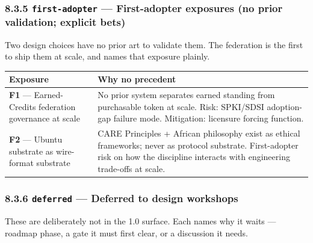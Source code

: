 \documentclass[11pt]{article}
\begin{document}
\subsubsection*{8.3.5 \texttt{first-adopter} — First-adopter exposures (no prior validation; explicit bets)}


Two design choices have no prior art to validate them. The federation is the first to ship them at scale, and names that exposure plainly.


{\footnotesize
\begin{longtable}{|p{8.0cm}|p{8.0cm}|}\hline
\textbf{Exposure} & \textbf{Why no precedent} \\ \hline\endhead
\textbf{F1} — Earned-Credits federation governance at scale & No prior system separates earned standing from purchasable token at scale. Risk: SPKI/SDSI adoption-gap failure mode. Mitigation: licensure forcing function. \\ \hline
\textbf{F2} — Ubuntu substrate as wire-format substrate & CARE Principles + African philosophy exist as ethical frameworks; never as protocol substrate. First-adopter risk on how the discipline interacts with engineering trade-offs at scale. \\ \hline
\end{longtable}}


\subsubsection*{8.3.6 \texttt{deferred} — Deferred to design workshops}


These are deliberately not in the 1.0 surface. Each names why it waits — roadmap phase, a gate it must first clear, or a discussion it needs.
\end{document}
